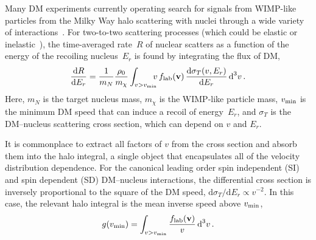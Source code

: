 \documentclass[prd,10pt,twocolumn,showpacs,nofootinbib,aps,superscriptaddress,preprintnumbers]{revtex4-1}
\newcommand{\vmin}{v_{\rm min}}
\begin{document}
  Many DM experiments currently operating search for signals
  from WIMP-like particles from the Milky Way halo scattering with
  nuclei through a wide variety of
  interactions~\cite{Drukier:1983gj,Goodman:1984dc,Undagoitia:2015gya}.  For two-to-two
  scattering processes (which could be elastic or
  inelastic~\cite{TuckerSmith:2001hy,Baudis:2013bba,McCabe:2015eia,Arcadi:2019hrw}),
  the time-averaged rate~$R$ of nuclear scatters as a function of the
  energy of the recoiling nucleus~$E_r$ is found by integrating the flux
  of DM,
  \begin{equation}\label{eq:eventrate}
   \frac{\textrm{d}R}{\textrm{d}E_r} = \frac{1}{m_N} \frac{\rho_0}{m_\chi} \int_{v>\vmin} \!\!\!\!  v \, f_{\rm{lab}}(\mathbf{v}) \,\frac{\mathrm{d} \sigma_T (v,E_r)}{\mathrm{d} E_r}  \, \textrm{d}^3v \, .
  \end{equation}
  Here, $m_N$ is the target nucleus mass, $m_{\chi}$ is the WIMP-like
  particle mass, $v_{\rm{min}}$ is the minimum DM speed that can induce
  a recoil of energy~$E_r$, and $\sigma_T$ is the DM--nucleus scattering
  cross section, which can depend on $v$ and $E_r$.

  It is commonplace to extract all factors of $v$ from the cross section
  and absorb them into the halo integral, a single object that
  encapsulates all of the velocity distribution dependence.  For the
  canonical leading order spin independent (SI) and spin dependent (SD)
  DM--nucleus interactions, the differential
  cross section is inversely proportional to the square of the DM speed,
  $\mathrm{d}\sigma_T/\mathrm{d}E_r\propto v^{-2}$. In this case, the
  relevant halo integral is the mean inverse speed above $v_{\rm min}$,
   \begin{equation}\label{eq:gvmina}
  g(v_{\rm min}) = \int_{v>\vmin} \frac{f_{\rm{lab}}(\textbf{v})}{v} \,
  \textrm{d}^3 v \, .
   \end{equation}
\end{document}
